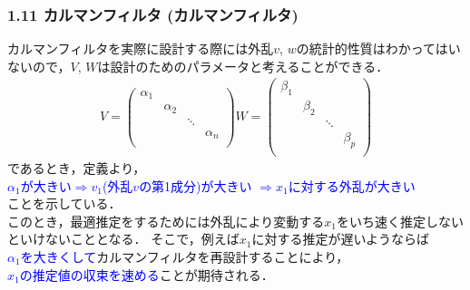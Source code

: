 \documentclass[10pt]{beamer}
\begin{document}
\begin{frame}[t]
\frametitle{1.11 カルマンフィルタ (カルマンフィルタ)}
カルマンフィルタを実際に設計する際には外乱$v$, $w$の統計的性質はわかってはいないので，$V$, $W$は設計のためのパラメータと考えることができる．
\begin{align}
  V =    \left(
      \begin{array}{cccc}
        \alpha_1 & & & \\
        & \alpha_2 & & \\
        & & \ddots & \\
        & & & \alpha_n \\
      \end{array}
    \right)
 
  W =    \left(
      \begin{array}{cccc}
        \beta_1 & & & \\
        & \beta_2 & & \\
        & & \ddots & \\
        & & & \beta_p \\
      \end{array}
    \right)
\end{align}
であるとき，定義より，\\
\textcolor{blue}{$\alpha_1$が大きい$\Longrightarrow v_1$(外乱$v$の第1成分)が大きい
$\Longrightarrow x_1$に対する外乱が大きい\\}
ことを示している．\\
このとき，最適推定をするためには外乱により変動する$x_1$をいち速く推定しないといけないこととなる．
そこで，例えば$x_1$に対する推定が遅いようならば\\
 \textcolor{blue}{$\alpha_1$を大きくして}カルマンフィルタを再設計することにより，\\
 \textcolor{blue}{$x_1$の推定値の収束を速める}ことが期待される．
\end{frame}
\end{document}
